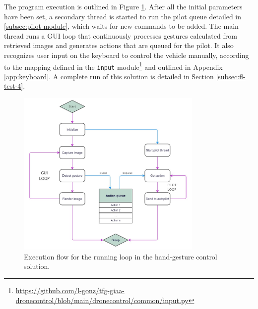 The program execution is outlined in Figure \ref{fig:hands-loop}.
After all the initial parameters have been set, a secondary thread is started to run the pilot queue detailed in \ref{subsec:pilot-module}, which waits for new commands to be added.
The main thread runs a GUI loop that continuously processes gestures calculated from retrieved images and generates actions that are queued for the pilot.
It also recognizes user input on the keyboard to control the vehicle manually, according to the mapping defined in the \texttt{input} module\footnote{\url{https://github.com/l-gonz/tfg-giaa-dronecontrol/blob/main/dronecontrol/common/input.py}} and outlined in Appendix \ref{app:keyboard}. A complete run of this solution is detailed in Section \ref{subsec:fl-test-4}.


\begin{figure}[H]
  \centering
  \includegraphics[width=0.8\textwidth, keepaspectratio]{img/hand-loop.jpg}
  \caption{Execution flow for the running loop in the hand-gesture control solution.}
  \label{fig:hands-loop}
\end{figure}
